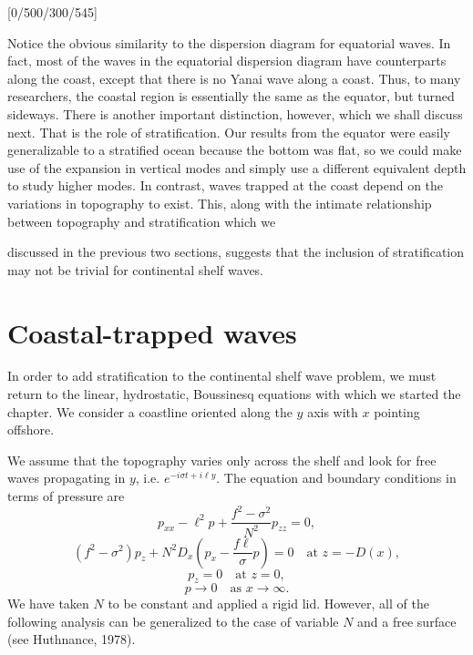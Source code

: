 [0/500/300/545]

Notice the obvious similarity to the dispersion diagram for equatorial waves. In fact,
most of the waves in the equatorial dispersion diagram have counterparts along the
coast, except that there is no Yanai wave along a coast. Thus, to many researchers, the
coastal region is essentially the same as the equator, but turned sideways. There is
another important distinction, however, which we shall discuss next. That is the role
of stratification. Our results from the equator were easily generalizable to a stratified
ocean because the bottom was flat, so we could make use of the expansion in vertical
modes and simply use a different equivalent depth to study higher modes. In contrast,
waves trapped at the coast depend on the variations in topography to exist. This, along
with the intimate relationship between topography and stratification which we

\sourcepagebreak

discussed in the previous two sections, suggests that the inclusion of stratification may
not be trivial for continental shelf waves.

\section{Coastal-trapped waves}

In order to add stratification to the continental shelf wave problem, we must return to
the linear, hydrostatic, Boussinesq equations with which we started the chapter. We
consider a coastline oriented along the $y$ axis with $x$ pointing offshore.


We assume that the topography varies only across the shelf and look for free waves
propagating in $y$, i.e. $e^{-i\sigma t+i\ell y}$. The equation and boundary conditions
in terms of pressure are
\[
	p_{xx}-\ell^2p+\frac{f^2-\sigma^2}{N^2}p_{zz}=0,
\]
\[
	(f^2-\sigma^2)p_z
	+N^2D_x\left(p_x-\frac{f\ell}{\sigma}p\right)=0
	\quad\text{at }z=-D(x),
\]
\[
	p_z=0\quad\text{at }z=0,
\]
\[
	p\to0\quad\text{as }x\to\infty.
\]
We have taken $N$ to be constant and applied a rigid lid. However, all of the following
analysis can be generalized to the case of variable $N$ and a free surface (see
Huthnance, 1978).

